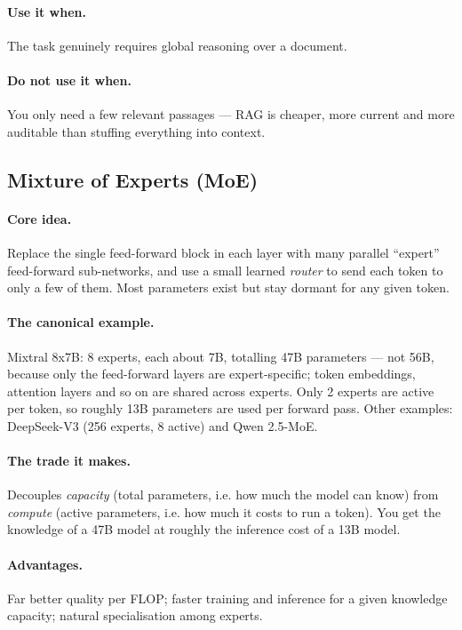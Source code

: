 \documentclass[11pt,a4paper]{article}
\begin{document}
\paragraph{Use it when.} The task genuinely requires global reasoning over a document.
\paragraph{Do not use it when.} You only need a few relevant passages --- RAG is cheaper,
more current and more auditable than stuffing everything into context.

\subsection{Mixture of Experts (MoE)}

\paragraph{Core idea.} Replace the single feed-forward block in each layer with many parallel
``expert'' feed-forward sub-networks, and use a small learned \emph{router} to send each token
to only a few of them. Most parameters exist but stay dormant for any given token.

\paragraph{The canonical example.} Mixtral 8x7B: 8 experts, each about 7B, totalling 47B
parameters --- not 56B, because only the feed-forward layers are expert-specific; token
embeddings, attention layers and so on are shared across experts. Only 2 experts are active
per token, so roughly 13B parameters are used per forward pass. Other examples: DeepSeek-V3
(256 experts, 8 active) and Qwen 2.5-MoE.

\paragraph{The trade it makes.} Decouples \emph{capacity} (total parameters, i.e. how much the
model can know) from \emph{compute} (active parameters, i.e. how much it costs to run a
token). You get the knowledge of a 47B model at roughly the inference cost of a 13B model.

\paragraph{Advantages.} Far better quality per FLOP; faster training and inference for a given
knowledge capacity; natural specialisation among experts.
\end{document}
